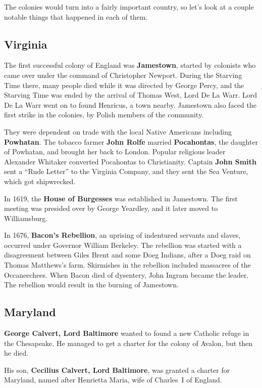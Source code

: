 The colonies would turn into a fairly important country,
so let's look at a couple notable things that happened in each of them.

\subsection*{Virginia}

The first successful colony of England was \textbf{Jamestown},
started by colonists who came over under the command of Christopher Newport.
During the Starving Time there, many people died while it was directed by George Percy,
and the Starving Time was ended by the arrival of Thomas West, Lord De La Warr.
Lord De La Warr went on to found Henricus, a town nearby.
Jamestown also faced the first strike in the colonies, by Polish members of the community.

They were dependent on trade with the local Native Americans including \textbf{Powhatan}.
The tobacco farmer \textbf{John Rolfe} married \textbf{Pocahontas},
the daughter of Powhatan, and brought her back to London.
Popular religious leader Alexander Whitaker converted Pocahontas to Christianity.
Captain \textbf{John Smith} sent a ``Rude Letter'' to the Virginia Company,
and they sent the Sea Venture, which got shipwrecked.

In 1619, the \textbf{House of Burgesses} was established in Jamestown.
The first meeting was presided over by George Yeardley,
and it later moved to Williamsburg.

In 1676, \textbf{Bacon's Rebellion}, an uprising of indentured servants and slaves,
occurred under Governor William Berkeley.
The rebellion was started with a disagreement between Giles Brent and some Doeg Indians,
after a Doeg raid on Thomas Matthews's farm.
Skirmishes in the rebellion included massacres of the Occaneechees.
When Bacon died of dysentery, John Ingram became the leader.
The rebellion would result in the burning of Jamestown.

\subsection*{Maryland}

\textbf{George Calvert, Lord Baltimore} wanted to found a new Catholic refuge in the Chesapeake.
He managed to get a charter for the colony of Avalon, but then he died.

His son, \textbf{Cecilius Calvert, Lord Baltimore}, was granted a charter for Maryland,
named after Henrietta Maria, wife of Charles~I of England.

